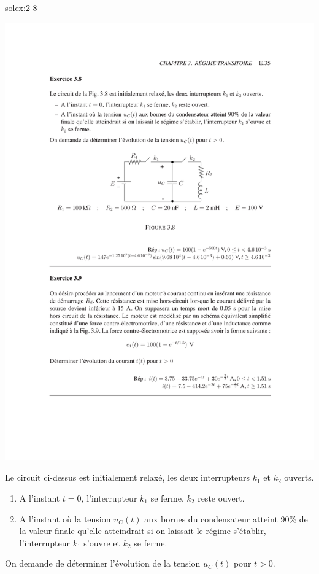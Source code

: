 \begin{exwithsol}{}{solex:2-8}
	\label{ex:2-8}
\begin{center}
	\includegraphics[width=0.95\linewidth]{exercices/ex-3-8}
\end{center}
Le circuit ci-dessus est initialement relax\'e, les deux
interrupteurs $k_1$ et $k_2$ ouverts. 
\begin{enumerate}
	\item A l'instant $t=0$, l'interrupteur $k_1$ se ferme, $k_2$ reste
	ouvert.
	\item A l'instant o\`u la tension $u_C(t)$ aux bornes du condensateur
	atteint 90\% de la valeur finale qu'elle atteindrait si on laissait
	le r\'egime s'\'etablir, l'interrupteur $k_1$ s'ouvre et $k_2$ se ferme.
\end{enumerate}
On demande de d\'eterminer l'\'evolution de la tension $u_C(t)$ pour $t>0$.

\end{exwithsol}

